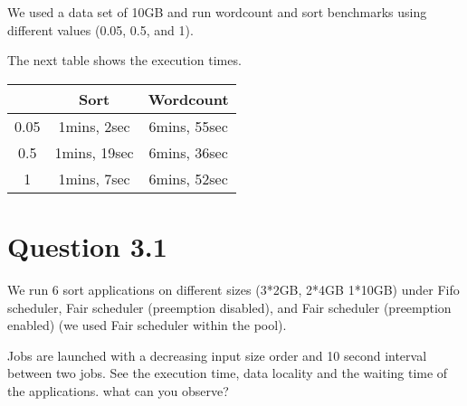 \documentclass{article}
\begin{document}
We used a data set of 10GB and run wordcount and sort benchmarks using
different values (0.05, 0.5, and 1).

The next table shows the execution times.

\begin{center}
\begin{tabular}{|c|c|c|}
\hline
\ & Sort & Wordcount \\
\hline
0.05 & 1mins, 2sec & 6mins, 55sec \\
\hline
0.5 & 1mins, 19sec & 6mins, 36sec \\
\hline
1 & 1mins, 7sec & 6mins, 52sec \\
\hline
\end{tabular}
\end{center}



\section*{Question 3.1}


We run 6 sort applications on different sizes (3*2GB, 2*4GB 1*10GB) under Fifo scheduler, Fair scheduler (preemption disabled), and Fair scheduler
(preemption enabled) (we used Fair scheduler within the pool).



Jobs are launched with a decreasing input size order and 10 second interval between two
jobs.
See the execution time, data locality and the waiting time of the applications. what can
you observe?
\end{document}
